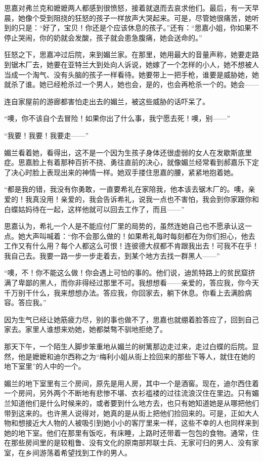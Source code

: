 \par 思嘉对弗兰克和嬷嬷两人都感到很愤怒，接着就退而去哀求他们。最后，有一天早晨，她像个受到阻挠的狂怒的孩子一样放声大哭起来。可是，尽管她很痛苦，她听到的只是：“好了，宝贝！你还是个应该休息的孩子。”还有：“思嘉小姐，你如果不停止哭闹，你的奶就会发酸，孩子就会患急腹痛，她会送命的。”
\par 狂怒之下，思嘉冲过后院，来到媚兰家。在那里，她用最大的音量声称，她要走路到锯木厂去，她要在亚特兰大到处向人诉说，她嫁了一个怎样的小人，她不想被人当成一个淘气、没有头脑的孩子一样看待。她要带上一把手枪，谁要是威胁她，她就杀了谁。她已经枪杀过一个男人，她也会，是的，也会再枪杀一个的。她会——
\par 连自家屋前的游廊都害怕走出去的媚兰，被这些威胁的话吓呆了。
\par “噢，你不该自个去冒险！如果你出了什么事，我宁愿去死！噢，别——”
\par “我要！我要！我要走——”
\par 媚兰看着她，看得出，这不是一个因为生孩子身体还很虚弱的女人在发歇斯底里症。思嘉脸上有着那种百折不挠、勇往直前的决心，就像媚兰经常看到郝嘉乐下定了决心时脸上表现出来的神情一样。她双手搂住思嘉的腰，紧紧地抱着她。
\par “都是我的错，我没有你勇敢，一直要希礼在家陪我，他本该去锯木厂的。噢，亲爱的！我真没用！亲爱的，我会告诉希礼，说我一点也不害怕，我会到你家跟你和白蝶姑妈待在一起，这样他就可以回去工作了，而且——”
\par 思嘉认为，希礼一个人是不能应付厂里的局势的，虽然连她自己也不愿承认这一点。她大声叫喊着：“你不会那么做的！如果希礼每时每刻都在为你们担心，他去工作又有什么用？每个人都这么可恨！连彼德大叔都不肯跟我出去！可我不在乎！我自己去。我要一路一步一步走着去，到某个地方去找一群黑人——”
\par “噢，不！你不能这么做！你会遇上可怕的事的。他们说，迪凯特路上的贫民窟挤满了卑鄙的黑人，而你非得经过那里不可。我想想看——亲爱的，答应我，你今天千万别干什么，我来想想办法。答应我，你回家去，躺下休息。你看上去满脸病容。答应我。”
\par 因为生气已经让她筋疲力尽，别的事也做不了，思嘉也就绷着脸答应了，回到自己家去。家里人谁想来劝她，她都桀骜不驯地拒绝了。
\par 那天下午，一个陌生人脚步笨重地从媚兰的树篱那边走过来，走过白蝶的后院。显然，他是嬷嬷和迪尔西称之为“梅利小姐从街上捡回来的那些下等人，就住在她的地下室里”的人中的一个。
\par 媚兰的地下室里有三个房间，原先是用人房，其中一个是酒窖。现在，迪尔西住着一个房间，另外两个不断地有悲惨不堪、衣衫褴褛的过往流浪汉住在里边。只有媚兰知道他们是什么时候来的，或者要到什么地方去，也只有她知道她是从哪把他们带到这来的。也许黑人说得对，她真的是从街上把他们捡回来的。可是，正如大人物和想接近大人物的人被吸引到她小小的客厅里来一样，这些不幸的人也同样来到她的地下室。他们在那里有饭吃，有床睡，上路时还带着一包包的食物。通常，住在那些房间里的是较粗鲁、没有文化的原南部邦联士兵、无家可归的男人、没有家室，在乡间游荡着希望找到工作的男人。
